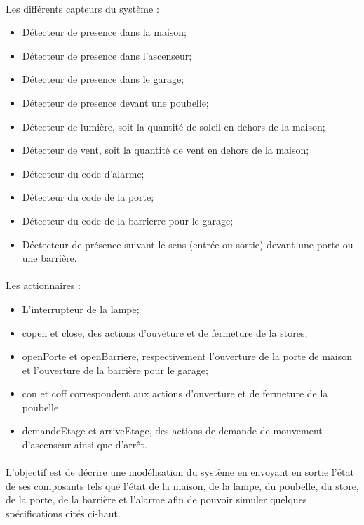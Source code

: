 \documentclass{svjour3}
\begin{document}
 \paragraph{}
 Les différents capteurs du système :
 \begin{itemize}
  \item Détecteur de presence dans la maison;
  \item Détecteur de presence dans l'ascenseur;
  \item Détecteur de presence dans le garage;
  \item Détecteur de presence devant une poubelle;
  \item Détecteur de lumière, soit la quantité de soleil en dehors de la maison;
  \item Détecteur de vent, soit la quantité de vent en dehors de la maison;
  \item Détecteur du code d'alarme;
  \item Détecteur du code de la porte;
  \item Détecteur du code de la barrierre pour le garage;
  \item Déctecteur de présence suivant le sens (entrée ou sortie) devant une porte ou une barrière.
 \end{itemize}
 \paragraph{}
 Les actionnaires :
 \begin{itemize}
  \item L'interrupteur de la lampe;
  \item copen et close, des actions d'ouveture et de fermeture de la stores;
  \item openPorte et openBarriere, respectivement l'ouverture de la porte de maison et l'ouverture de la barrière pour le garage;
  \item con et coff correspondent aux actions d'ouverture et de fermeture de la poubelle
  \item demandeEtage et arriveEtage, des actions de demande de mouvement d'ascenseur ainsi que d'arrêt. 
 \end{itemize}
\paragraph{}
 L'objectif est de décrire une modélisation du système en envoyant en sortie l'état de ses composants tels que l'état de la maison, de la lampe, du poubelle, 
 du store, de la porte, de la barrière et l'alarme afin de pouvoir simuler quelques spécifications cités ci-haut.
\end{document}
